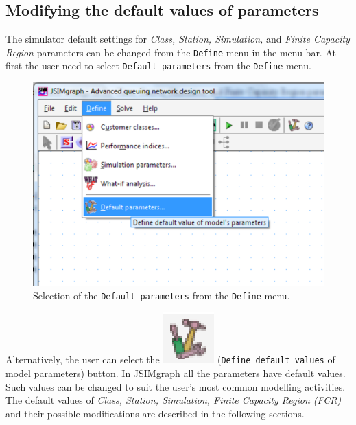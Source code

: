\subsection{Modifying the default values of parameters}
\label{modefpara} The simulator default settings for \emph{Class,
Station, Simulation,} and \emph{Finite Capacity Region} parameters
can be changed from the \texttt{Define} menu in the menu bar. At
first the user need to select \texttt{Default parameters} from the
\texttt{Define} menu.
\begin{figure}[htb]
    \begin{center}
        \includegraphics[scale=.5]{img/jsimg/9.1.eps}
    \end{center}
    \caption{Selection of the \texttt{Default parameters} from the
    \texttt{Define} menu.}
    \label{fig:seldepardef}
\end{figure}
Alternatively, the user can select the
\includegraphics[scale=.5]{img/jsimg/defineDefaults} (\texttt{Define
default values} of model parameters) button. In JSIMgraph all the
parameters have default values. Such values can be changed to suit
the user's most common modelling activities. The default values of
\emph{Class, Station, Simulation, Finite Capacity Region (FCR)}
and their possible modifications are described in the
following sections.\\

